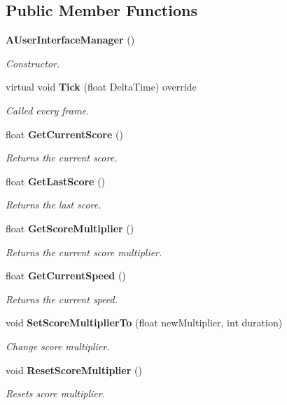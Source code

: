 \subsection*{Public Member Functions}
\begin{DoxyCompactItemize}
\item 
\textbf{ A\+User\+Interface\+Manager} ()
\begin{DoxyCompactList}\small\item\em Constructor. \end{DoxyCompactList}\item 
virtual void \textbf{ Tick} (float Delta\+Time) override
\begin{DoxyCompactList}\small\item\em Called every frame. \end{DoxyCompactList}\item 
float \textbf{ Get\+Current\+Score} ()
\begin{DoxyCompactList}\small\item\em Returns the current score. \end{DoxyCompactList}\item 
float \textbf{ Get\+Last\+Score} ()
\begin{DoxyCompactList}\small\item\em Returns the last score. \end{DoxyCompactList}\item 
float \textbf{ Get\+Score\+Multiplier} ()
\begin{DoxyCompactList}\small\item\em Returns the current score multiplier. \end{DoxyCompactList}\item 
float \textbf{ Get\+Current\+Speed} ()
\begin{DoxyCompactList}\small\item\em Returns the current speed. \end{DoxyCompactList}\item 
void \textbf{ Set\+Score\+Multiplier\+To} (float new\+Multiplier, int duration)
\begin{DoxyCompactList}\small\item\em Change score multiplier. \end{DoxyCompactList}\item 
void \textbf{ Reset\+Score\+Multiplier} ()
\begin{DoxyCompactList}\small\item\em Resets score multiplier. \end{DoxyCompactList}\item 

\end{DoxyCompactItemize}
